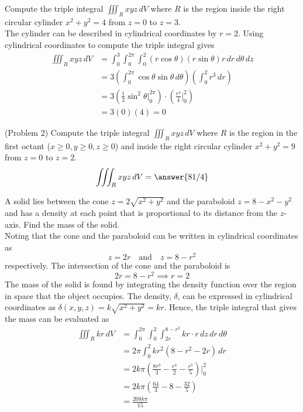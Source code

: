 \documentclass[handout]{ximera}
\begin{document}
\begin{example}[Example 2]
Compute the triple integral $\iiint_R xyz \, dV$ where $R$ is the region inside the right circular cylinder $ x^2 + y^2 = 4$ from $z = 0 $ to $z = 3$.\\
The cylinder can be described in cylindrical coordinates by $r = 2$. Using cylindrical coordinates to compute the triple integral gives
\begin{align*}
\iiint_R xyz \, dV &= \int_0^3 \int_0^{2\pi} \int_0^2 (r\cos \theta)(r\sin\theta) r \, dr\, d\theta\, dz \\
                   &= 3 \left( \int_0^{2\pi} \cos \theta \sin \theta \, d\theta\right) \left( \int_0^2 r^3 \, dr\right)\\
                   &= 3 \left(\frac12 \sin^2 \theta \bigg|_0^{2\pi} \right) \cdot \left( \frac{r^4}{4} \bigg|_0^2 \right)\\
                   &= 3 (0) (4) = 0
\end{align*}
\end{example}


\begin{problem}(Problem 2)
Compute the triple integral $\iiint_R xyz \, dV$ where $R$ is the region in the first octant ($x\geq 0, y \geq 0, z \geq 0$) and 
inside the right circular cylinder $ x^2 + y^2 = 9$ from $z = 0 $ to $z = 2$.\\
\[ 
\iiint_R xyz \, dV = \answer{81/4}
\]
\end{problem}

\begin{example}[Example 3]
A solid lies between the cone $z = 2\sqrt{x^2 + y^2}$ and the paraboloid $z = 8 - x^2 - y^2$ and has a 
density at each point that is proportional to its distance from the $z$-axis. Find the mass of the solid.\\

Noting that the cone and the paraboloid can be written in cylindrical coordinates as
\[
 z = 2r \quad \text{and} \quad  z = 8 - r^2
\]
respectively. The intersection of the cone and the paraboloid is
\[
2r = 8 - r^2 \implies r = 2
\]
The mass of the solid is found by integrating the density function over the region in space that the object occupies.
The density, $\delta$, can be expressed in cylindrical coordinates as $\delta(x, y, z) = k \sqrt{x^2+y^2} = kr$.
Hence, the triple integral that gives the mass can be evaluated as
\begin{align*}
\iiint_R kr \, dV &=  \int_0^{2\pi} \int_0^2 \int_{2r}^{8-r^2} kr \cdot r \, dz \, dr \, d\theta \\
                  &= 2\pi \int_0^2 kr^2 (8 - r^2 - 2r) \,dr\\
                  &= 2k\pi \left(\frac{8r^3}{3} - \frac{r^4}{2} - \frac{r^5}{5} \right)\bigg|_0^2 \\
                  &= 2k\pi \left(\frac{64}{3} - 8 - \frac{32}{5}\right)\\
                  &= \frac{208k\pi}{15}
\end{align*}
\end{example}
\end{document}

